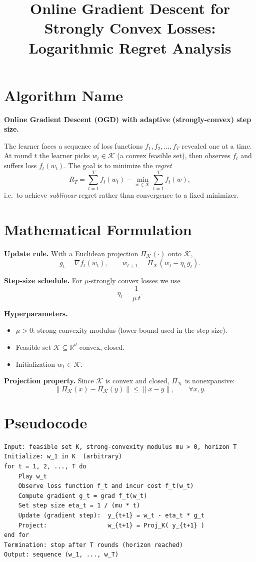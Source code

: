 \documentclass[11pt]{article}
\title{Online Gradient Descent for Strongly Convex Losses:\\ Logarithmic Regret Analysis}
\author{}
\date{}
\begin{document}
\maketitle

\section*{Algorithm Name}
\textbf{Online Gradient Descent (OGD) with adaptive (strongly-convex) step size.}

The learner faces a sequence of loss functions $f_1, f_2, \dots, f_T$ revealed one at a time. 
At round $t$ the learner picks $w_t \in \mathcal{K}$ (a convex feasible set), then observes $f_t$ 
and suffers loss $f_t(w_t)$. The goal is to minimize the \emph{regret}
\[
R_T = \sum_{t=1}^T f_t(w_t) - \min_{w \in \mathcal{K}} \sum_{t=1}^T f_t(w),
\]
i.e.\ to achieve \emph{sublinear} regret rather than convergence to a fixed minimizer.

\section*{Mathematical Formulation}

\textbf{Update rule.} With a Euclidean projection $\Pi_{\mathcal{K}}(\cdot)$ onto $\mathcal{K}$,
\[
g_t = \nabla f_t(w_t), \qquad
w_{t+1} = \Pi_{\mathcal{K}}\!\left( w_t - \eta_t\, g_t \right).
\]

\textbf{Step-size schedule.} For $\mu$-strongly convex losses we use
\[
\eta_t = \frac{1}{\mu\, t}.
\]

\textbf{Hyperparameters.}
\begin{itemize}
  \item $\mu > 0$: strong-convexity modulus (lower bound used in the step size).
  \item Feasible set $\mathcal{K} \subseteq \mathbb{R}^d$ convex, closed.
  \item Initialization $w_1 \in \mathcal{K}$.
\end{itemize}

\textbf{Projection property.} Since $\mathcal{K}$ is convex and closed, $\Pi_{\mathcal{K}}$ is nonexpansive:
\[
\|\Pi_{\mathcal{K}}(x) - \Pi_{\mathcal{K}}(y)\| \le \|x - y\|, \qquad \forall x,y .
\]

\section*{Pseudocode}
\begin{verbatim}
Input: feasible set K, strong-convexity modulus mu > 0, horizon T
Initialize: w_1 in K  (arbitrary)
for t = 1, 2, ..., T do
    Play w_t
    Observe loss function f_t and incur cost f_t(w_t)
    Compute gradient g_t = grad f_t(w_t)
    Set step size eta_t = 1 / (mu * t)
    Update (gradient step):  y_{t+1} = w_t - eta_t * g_t
    Project:                 w_{t+1} = Proj_K( y_{t+1} )
end for
Termination: stop after T rounds (horizon reached)
Output: sequence (w_1, ..., w_T)
\end{verbatim}
\end{document}

